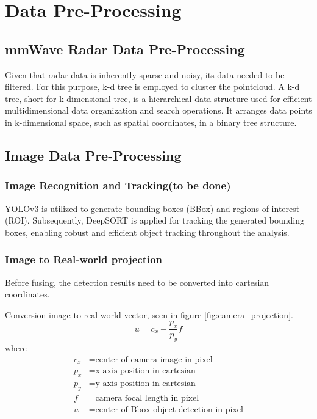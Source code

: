 \section{Data Pre-Processing}\label{sec:2-preprocessing}
\subsection{mmWave Radar Data Pre-Processing}\label{sec:2-kd_tree}
Given that radar data is inherently sparse and noisy, its data needed to be filtered.
For this purpose, k-d tree is employed to cluster the pointcloud.
A k-d tree, short for k-dimensional tree, is a hierarchical data structure used for efficient multidimensional data organization and search operations. 
It arranges data points in k-dimensional space, such as spatial coordinates, in a binary tree structure. 

\subsection{Image Data Pre-Processing}\label{sec:2-img_recognition}
\subsubsection{Image Recognition and Tracking\small(to be done)}
YOLOv3 is utilized to generate bounding boxes (BBox) and regions of interest (ROI)\cite{redmon2018yolov3}.
Subsequently, DeepSORT is applied for tracking the generated bounding boxes, 
enabling robust and efficient object tracking throughout the analysis\cite{Wojke2017simple}.

\subsubsection{Image to Real-world projection}
Before fusing, the detection results need to be converted into cartesian coordinates.

Conversion image to real-world vector, seen in figure \ref{fig:camera_projection}.
\begin{equation}\label{equ:img2cart}
u=c_x-\frac{p_x}{p_y}f
\end{equation}
where
\begin{align*}
    c_x &=\text{center of camera image in pixel}\\
    p_x &=\text{x-axis position in cartesian}\\
    p_y &=\text{y-axis position in cartesian}\\
    f &=\text{camera focal length in pixel}\\
    u &=\text{center of Bbox object detection in pixel}
\end{align*}

